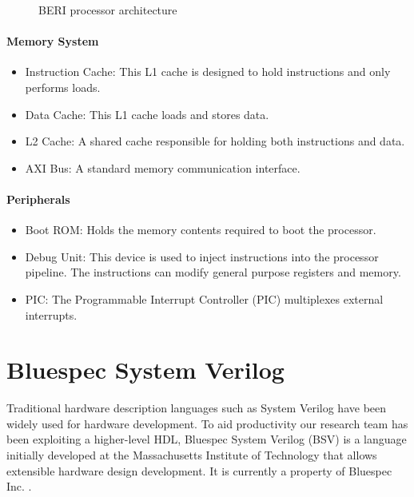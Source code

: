 	\begin{figure}[t]
		\centering 
			\caption{BERI processor architecture} 
			\label{beri_pipeline}
	\end{figure}

	\paragraph{Memory System}
		\begin{itemize}
			\item Instruction Cache: This L1 cache is designed to hold instructions and only performs loads.
			\item Data Cache: This L1 cache loads and stores data.
			\item L2 Cache: A shared cache responsible for holding both instructions and data.
			\item AXI Bus: A standard memory communication interface.
		\end{itemize}
		
	\paragraph{Peripherals}
		\begin{itemize}
			\item Boot ROM: Holds the memory contents required to boot the processor.
			\item Debug Unit: This device is used to inject instructions into the processor pipeline. The instructions can modify general purpose registers and memory. 
			\item PIC: The Programmable Interrupt Controller (PIC) multiplexes external interrupts.
		\end{itemize}
	
\section{Bluespec System Verilog}
	Traditional hardware description languages such as System Verilog have been widely used for hardware development. To aid productivity our research team has been exploiting a higher-level HDL, Bluespec System Verilog (BSV) \cite{bluespec,richards10} is a language initially developed at the Massachusetts Institute of Technology that allows extensible hardware design development. It is currently a property of Bluespec Inc. \cite{BSVREF}. 
	
